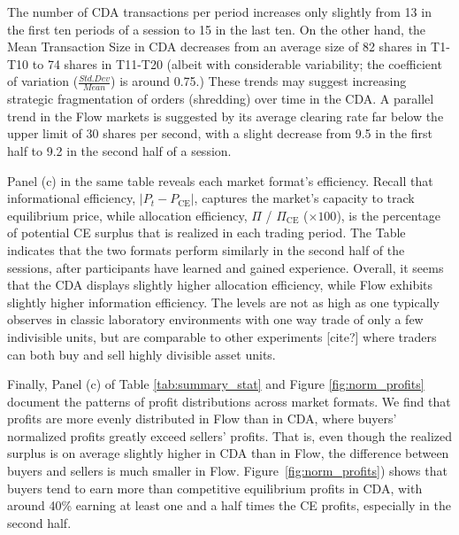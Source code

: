 The number of CDA transactions per period increases only slightly from 13 in the first ten periods of a session to 15 in the last ten. On the other hand, the Mean Transaction Size in CDA  decreases from an average size of 82 shares in T1-T10 to 74 shares in T11-T20 (albeit with considerable variability; the coefficient of variation ($\frac{Std. Dev}{Mean}$) is around 0.75.) 
These trends may suggest increasing strategic fragmentation of orders
(shredding) over time in the CDA.
A parallel trend in the Flow markets is suggested by its average clearing rate far below the upper limit of 30 shares per second, with a slight decrease from 9.5 in the first half to 9.2 in the second half of a session. 

Panel (c) in the same table reveals each market format's efficiency. Recall that informational efficiency, $\lvert P_t - P_{\text{CE}} \rvert $, captures the market's capacity to track  equilibrium price, while  allocation efficiency,  $\Pi$ / $\Pi_{\text{CE}}$ ($\times 100$), is the percentage of potential CE surplus that is realized in each trading period. The Table indicates that the two formats perform similarly in the second half of the sessions, after participants have learned and gained experience. %
Overall, it seems that the CDA displays slightly higher allocation efficiency, while Flow exhibits slightly higher information efficiency. The levels are not as high as one typically observes in classic laboratory environments with one way trade of only a few indivisible units, but are comparable to other experiments [cite?] where traders can both buy and sell highly divisible asset units.

Finally, Panel (c) of Table \ref{tab:summary_stat} and Figure \ref{fig:norm_profits}  document the patterns of profit distributions across market formats. We find that profits are more evenly distributed in Flow than in CDA, where buyers' normalized profits greatly exceed sellers' profits. That is, even though the realized surplus is on average slightly higher in CDA than in Flow, the difference between buyers and sellers is much smaller in Flow. 
Figure~\ref{fig:norm_profits}) shows that buyers tend to earn more than competitive equilibrium profits in CDA, with around 40\% earning at least one and a half times the CE profits, especially in the second half. 



